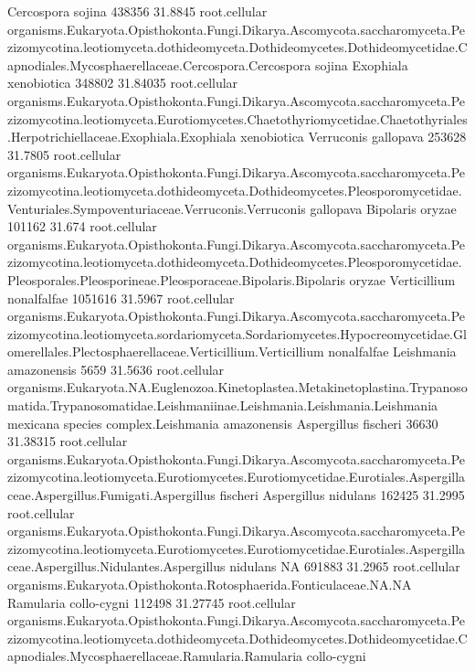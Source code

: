 \documentclass{article}
\begin{document}
\begin{Schunk}
\begin{Soutput}
 Cercospora sojina 		 438356 31.8845 	 root.cellular organisms.Eukaryota.Opisthokonta.Fungi.Dikarya.Ascomycota.saccharomyceta.Pezizomycotina.leotiomyceta.dothideomyceta.Dothideomycetes.Dothideomycetidae.Capnodiales.Mycosphaerellaceae.Cercospora.Cercospora sojina
 Exophiala xenobiotica 		 348802 31.84035 	 root.cellular organisms.Eukaryota.Opisthokonta.Fungi.Dikarya.Ascomycota.saccharomyceta.Pezizomycotina.leotiomyceta.Eurotiomycetes.Chaetothyriomycetidae.Chaetothyriales.Herpotrichiellaceae.Exophiala.Exophiala xenobiotica
 Verruconis gallopava 		 253628 31.7805 	 root.cellular organisms.Eukaryota.Opisthokonta.Fungi.Dikarya.Ascomycota.saccharomyceta.Pezizomycotina.leotiomyceta.dothideomyceta.Dothideomycetes.Pleosporomycetidae.Venturiales.Sympoventuriaceae.Verruconis.Verruconis gallopava
 Bipolaris oryzae 		 101162 31.674 	 root.cellular organisms.Eukaryota.Opisthokonta.Fungi.Dikarya.Ascomycota.saccharomyceta.Pezizomycotina.leotiomyceta.dothideomyceta.Dothideomycetes.Pleosporomycetidae.Pleosporales.Pleosporineae.Pleosporaceae.Bipolaris.Bipolaris oryzae
 Verticillium nonalfalfae 		 1051616 31.5967 	 root.cellular organisms.Eukaryota.Opisthokonta.Fungi.Dikarya.Ascomycota.saccharomyceta.Pezizomycotina.leotiomyceta.sordariomyceta.Sordariomycetes.Hypocreomycetidae.Glomerellales.Plectosphaerellaceae.Verticillium.Verticillium nonalfalfae
 Leishmania amazonensis 		 5659 31.5636 	 root.cellular organisms.Eukaryota.NA.Euglenozoa.Kinetoplastea.Metakinetoplastina.Trypanosomatida.Trypanosomatidae.Leishmaniinae.Leishmania.Leishmania.Leishmania mexicana species complex.Leishmania amazonensis
 Aspergillus fischeri 		 36630 31.38315 	 root.cellular organisms.Eukaryota.Opisthokonta.Fungi.Dikarya.Ascomycota.saccharomyceta.Pezizomycotina.leotiomyceta.Eurotiomycetes.Eurotiomycetidae.Eurotiales.Aspergillaceae.Aspergillus.Fumigati.Aspergillus fischeri
 Aspergillus nidulans 		 162425 31.2995 	 root.cellular organisms.Eukaryota.Opisthokonta.Fungi.Dikarya.Ascomycota.saccharomyceta.Pezizomycotina.leotiomyceta.Eurotiomycetes.Eurotiomycetidae.Eurotiales.Aspergillaceae.Aspergillus.Nidulantes.Aspergillus nidulans
 NA 		 691883 31.2965 	 root.cellular organisms.Eukaryota.Opisthokonta.Rotosphaerida.Fonticulaceae.NA.NA
 Ramularia collo-cygni 		 112498 31.27745 	 root.cellular organisms.Eukaryota.Opisthokonta.Fungi.Dikarya.Ascomycota.saccharomyceta.Pezizomycotina.leotiomyceta.dothideomyceta.Dothideomycetes.Dothideomycetidae.Capnodiales.Mycosphaerellaceae.Ramularia.Ramularia collo-cygni
\end{Soutput}
\begin{Sinput}

\end{Sinput}
\end{Schunk}
\end{document}
